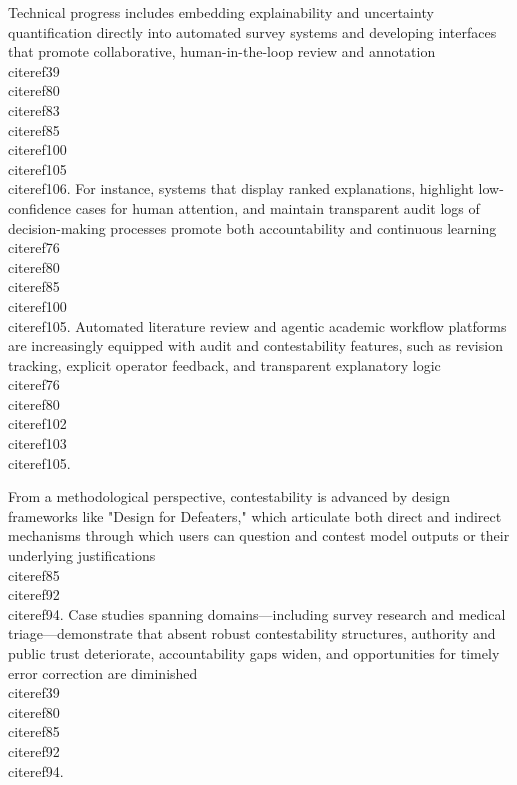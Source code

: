\documentclass[11pt]{article}
\begin{document}
Technical progress includes embedding explainability and uncertainty quantification directly into automated survey systems and developing interfaces that promote collaborative, human-in-the-loop review and annotation \\cite{ref39}\\cite{ref80}\\cite{ref83}\\cite{ref85}\\cite{ref100}\\cite{ref105}\\cite{ref106}. For instance, systems that display ranked explanations, highlight low-confidence cases for human attention, and maintain transparent audit logs of decision-making processes promote both accountability and continuous learning \\cite{ref76}\\cite{ref80}\\cite{ref85}\\cite{ref100}\\cite{ref105}. Automated literature review and agentic academic workflow platforms are increasingly equipped with audit and contestability features, such as revision tracking, explicit operator feedback, and transparent explanatory logic \\cite{ref76}\\cite{ref80}\\cite{ref102}\\cite{ref103}\\cite{ref105}.

From a methodological perspective, contestability is advanced by design frameworks like "Design for Defeaters," which articulate both direct and indirect mechanisms through which users can question and contest model outputs or their underlying justifications \\cite{ref85}\\cite{ref92}\\cite{ref94}. Case studies spanning domains—including survey research and medical triage—demonstrate that absent robust contestability structures, authority and public trust deteriorate, accountability gaps widen, and opportunities for timely error correction are diminished \\cite{ref39}\\cite{ref80}\\cite{ref85}\\cite{ref92}\\cite{ref94}.
\end{document}
